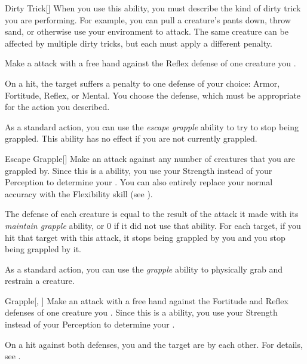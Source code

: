         \begin{activeability}{Dirty Trick}[]
            \rankline
            When you use this ability, you must describe the kind of dirty trick you are performing.
            For example, you can pull a creature's pants down, throw sand, or otherwise use your environment to attack.
            The same creature can be affected by multiple dirty tricks, but each must apply a different penalty.

            Make a attack with a free hand against the Reflex defense of one creature you .

            On a hit, the target  suffers a  penalty to one defense of your choice: Armor, Fortitude, Reflex, or Mental.
            You choose the defense, which must be appropriate for the action you described.
        \end{activeability}

        \label{Escape Grapple} As a standard action, you can use the \textit{escape grapple} ability to try to stop being grappled.
        This ability has no effect if you are not currently grappled.

        \begin{activeability}{Escape Grapple}[]
            \rankline
            Make an attack against any number of creatures that you are grappled by.
            Since this is a  ability, you use your Strength instead of your Perception to determine your .
            You can also entirely replace your normal accuracy with the Flexibility skill (see ).

            The defense of each creature is equal to the result of the attack it made with its \textit{maintain grapple} ability, or 0 if it did not use that ability.
            For each target, if you hit that target with this attack, it stops being grappled by you and you stop being grappled by it.
        \end{activeability}

        \label{Grapple} As a standard action, you can use the \textit{grapple} ability to physically grab and restrain a creature.

        \begin{activeability}{Grapple}[, ]
            \rankline
            Make an attack with a free hand against the Fortitude and Reflex defenses of one creature you .
            Since this is a  ability, you use your Strength instead of your Perception to determine your .

            On a hit against both defenses, you and the target are \grappled by each other.
            For details, see .
        \end{activeability}

